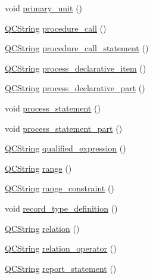 \begin{DoxyCompactItemize}
\item 
void \hyperlink{classvhdl_1_1parser_1_1_vhdl_parser_aa9d23517e90f462d1ae230f0c9b4a70f}{primary\+\_\+unit} ()
\item 
\hyperlink{class_q_c_string}{Q\+C\+String} \hyperlink{classvhdl_1_1parser_1_1_vhdl_parser_a4b2a205eb74f60b1733eef67f0674ed3}{procedure\+\_\+call} ()
\item 
\hyperlink{class_q_c_string}{Q\+C\+String} \hyperlink{classvhdl_1_1parser_1_1_vhdl_parser_a8a326a7ed96faa4761cb651823d29698}{procedure\+\_\+call\+\_\+statement} ()
\item 
\hyperlink{class_q_c_string}{Q\+C\+String} \hyperlink{classvhdl_1_1parser_1_1_vhdl_parser_aef18dbf2d96ee5f2edf7801ac3c8d793}{process\+\_\+declarative\+\_\+item} ()
\item 
\hyperlink{class_q_c_string}{Q\+C\+String} \hyperlink{classvhdl_1_1parser_1_1_vhdl_parser_a93f9394853d3b6e4dd0ec57e53d8ed75}{process\+\_\+declarative\+\_\+part} ()
\item 
void \hyperlink{classvhdl_1_1parser_1_1_vhdl_parser_a889ecc2c4b9a1ad6a5f9691ca8bbbfc9}{process\+\_\+statement} ()
\item 
void \hyperlink{classvhdl_1_1parser_1_1_vhdl_parser_a2f98241378091ffa451534eeb0eb8215}{process\+\_\+statement\+\_\+part} ()
\item 
\hyperlink{class_q_c_string}{Q\+C\+String} \hyperlink{classvhdl_1_1parser_1_1_vhdl_parser_a0cdb8ef38c23758ad7041fc4873f6df3}{qualified\+\_\+expression} ()
\item 
\hyperlink{class_q_c_string}{Q\+C\+String} \hyperlink{classvhdl_1_1parser_1_1_vhdl_parser_a8636e9ba107fa181d2d73d2bc721d609}{range} ()
\item 
\hyperlink{class_q_c_string}{Q\+C\+String} \hyperlink{classvhdl_1_1parser_1_1_vhdl_parser_ac352688bb8df9e5ce2ad5a4db4fd768a}{range\+\_\+constraint} ()
\item 
void \hyperlink{classvhdl_1_1parser_1_1_vhdl_parser_a5a74b640c66bde05a3de57d84df37275}{record\+\_\+type\+\_\+definition} ()
\item 
\hyperlink{class_q_c_string}{Q\+C\+String} \hyperlink{classvhdl_1_1parser_1_1_vhdl_parser_a5ac7f7e48bf98890435f773e9cc7ffa6}{relation} ()
\item 
\hyperlink{class_q_c_string}{Q\+C\+String} \hyperlink{classvhdl_1_1parser_1_1_vhdl_parser_af2508df49dfad511fb3909154ebd9aa2}{relation\+\_\+operator} ()
\item 
\hyperlink{class_q_c_string}{Q\+C\+String} \hyperlink{classvhdl_1_1parser_1_1_vhdl_parser_a1974460cc7cee6795eab99cb8d46e0cc}{report\+\_\+statement} ()

\end{DoxyCompactItemize}
